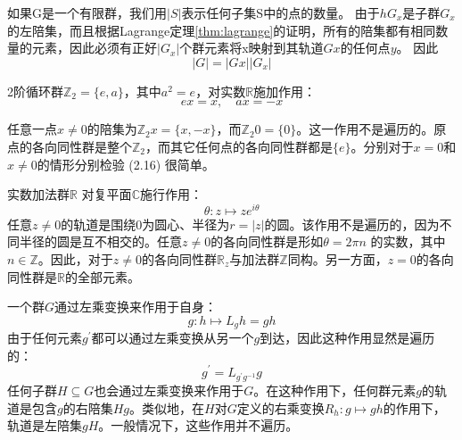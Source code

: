 如果G是一个有限群，我们用$|S|$表示任何子集S中的点的数量。 由于$h G_{x}$是子群$G_{x}$的左陪集，而且根据Lagrange定理\ref{thm:lagrange}的证明，所有的陪集都有相同数量的元素，因此必须有正好$\left|G_{x}\right|$个群元素将x映射到其轨道$G x$的任何点$y$。 因此
\begin{equation} \label{eq:2.16}  
    |G|=|G x|\left|G_{x}\right| 
\end{equation}
\begin{eg}
2阶循环群$\mathbb{Z}_{2}=\{e, a\}$，其中$a^{2}=e$，对实数$\mathbb{R}$施加作用：
$$
e x=x, \quad a x=-x
$$

任意一点$x \neq 0$的陪集为$\mathbb{Z}_{2} x=\{x,-x\}$，而$\mathbb{Z}_{2} 0=\{0\}$。这一作用不是遍历的。原点的各向同性群是整个$\mathbb{Z}_{2}$，而其它任何点的各向同性群都是$\{e\}$。分别对于$x=0$和$x \neq 0$的情形分别检验 (2.16) 很简单。
\end{eg}
\begin{eg}
    实数加法群$\mathbb{R}$ 对复平面$\mathbb{C}$施行作用：
$$
\theta: z \mapsto z e^{i \theta}
$$
任意$z \neq 0$的轨道是围绕0为圆心、半径为$r=|z|$的圆。该作用不是遍历的，因为不同半径的圆是互不相交的。任意$z \neq 0$的各向同性群是形如$\theta=2 \pi n$ 的实数，其中$n \in \mathbb{Z}$。因此，对于$z \neq 0$的各向同性群$\mathbb{R}_{z}$与加法群$\mathbb{Z}$同构。另一方面，$z=0$的各向同性群是$\mathbb{R}$的全部元素。
\end{eg}
\begin{eg}
 一个群$G$通过左乘变换来作用于自身：
$$
g: h \mapsto L_{g} h=g h
$$
由于任何元素$g^{\prime}$都可以通过左乘变换从另一个$g$到达，因此这种作用显然是遍历的：
$$
g^{\prime}=L_{g^{\prime} g^{-1}} g
$$
任何子群$H \subseteq G$也会通过左乘变换来作用于$G$。在这种作用下，任何群元素$g$的轨道是包含$g$的右陪集$H g$。类似地，在$H$对$G$定义的右乘变换$R_{h}: g \mapsto g h$的作用下，轨道是左陪集$g H$。一般情况下，这些作用并不遍历。
\end{eg}
